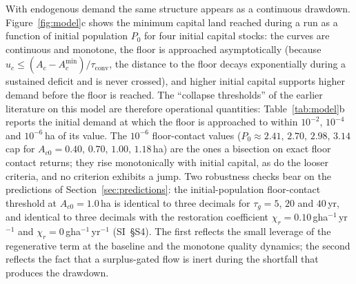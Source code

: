 \documentclass[preprint,12pt,authoryear]{elsarticle}
\newcommand{\Acmin}{A_c^{\min}}
\newcommand{\tconv}{\tau_{\mathrm{conv}}}
\begin{document}
With endogenous demand the same structure appears as a continuous drawdown. Figure~\ref{fig:model}c shows the minimum capital land reached during a run as a function of initial population $P_0$ for four initial capital stocks: the curves are continuous and monotone, the floor is approached asymptotically (because $u_c\le(A_c-\Acmin)/\tconv$, the distance to the floor decays exponentially during a sustained deficit and is never crossed), and higher initial capital supports higher demand before the floor is reached. The ``collapse thresholds'' of the earlier literature on this model are therefore operational quantities: Table~\ref{tab:model}b reports the initial demand at which the floor is approached to within $10^{-2}$, $10^{-4}$ and $10^{-6}$\,ha of its value. The $10^{-6}$ floor-contact values ($P_0\approx2.41,\,2.70,\,2.98,\,3.14$\,cap for $A_{c0}=0.40,\,0.70,\,1.00,\,1.18$\,ha) are the ones a bisection on exact floor contact returns; they rise monotonically with initial capital, as do the looser criteria, and no criterion exhibits a jump. Two robustness checks bear on the predictions of Section~\ref{sec:predictions}: the initial-population floor-contact threshold at $A_{c0}=1.0$\,ha is identical to three decimals for $\tau_g=5$, $20$ and $40$\,yr, and identical to three decimals with the restoration coefficient $\chi_r=0.10$\,gha$^{-1}$\,yr$^{-1}$ and $\chi_r=0$\,gha$^{-1}$\,yr$^{-1}$ (SI~\S S4). The first reflects the small leverage of the regenerative term at the baseline and the monotone quality dynamics; the second reflects the fact that a surplus-gated flow is inert during the shortfall that produces the drawdown.
\end{document}

